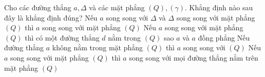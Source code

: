 \documentclass[12pt,a4paper]{article}
\begin{document}
\begin{ex}
	Cho các đường thẳng ${a,\Delta}$ và các mặt phẳng ${(Q), (\gamma)}$. Khẳng định nào sau đây là khẳng định đúng? 
	\choice
	{ Nếu ${a}$ song song với ${\Delta}$ và ${\Delta}$ song song với mặt phẳng ${(Q)}$ thì ${a}$ song song với mặt phẳng ${(Q)}$ }
	{ \True Nếu ${a}$ song song với mặt phẳng ${(Q)}$ thì có một đường thẳng ${d}$ nằm trong ${(Q)}$ sao ${a}$ và ${a}$ đồng phẳng }
	{ Nếu đường thẳng ${a}$ không nằm trong mặt phẳng ${(Q)}$ thì ${a}$ song song với ${(Q)}$ }
	{ Nếu ${a}$ song song với mặt phẳng ${(Q)}$ thì ${a}$ song song với mọi đường thẳng nằm trên mặt phẳng ${(Q)}$ }
	\end{ex}







\newpage 
\end{document}
